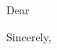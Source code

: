 \documentclass[12 pt]{letter}
\begin{document}
\begin{letter}{}
\opening{Dear}




\closing{Sincerely,}

\end{letter}
\end{document}
